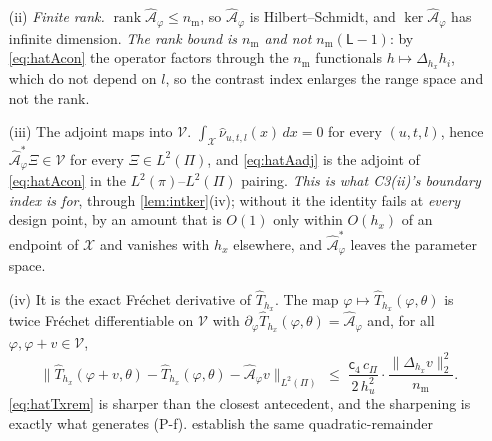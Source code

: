 \begin{proposition}
\begin{enumerate}
{for the other}, which is why \eqref{eq:normconst} carries the \textbf{maximum} of the two conversion
costs and why \cref{def:lfstep} can then assert $\|\omega_n^{-1}\hat{\mathcal A}_\varphi\|\le1$ surely in
both. \emph{This clause is stated here and not inside \cref{def:lfstep} on \cref{rem:obligations}'s
test}: a definition may \emph{fix} a constant, but the inequality that constant has to satisfy is a
claim and belongs to a result. \emph{And it consumes \textbf{less} than \textup{(i)} does}: C1(ii) is
read by neither \eqref{eq:hatAdx} nor \eqref{eq:hatAhatpi}, and only by \eqref{eq:pairgap}, which
compares the two.
\item[(ii)] \emph{Finite rank.} $\operatorname{rank}\hat{\mathcal A}_\varphi\le n_{\mathrm m}$, so
$\hat{\mathcal A}_\varphi$ is Hilbert--Schmidt, and $\ker\hat{\mathcal A}_\varphi$ has infinite
dimension. \emph{The rank bound is $n_{\mathrm m}$ and not $n_{\mathrm m}(\mathsf L-1)$}: by
\eqref{eq:hatAcon} the operator factors through the $n_{\mathrm m}$ functionals
$h\mapsto\Delta_{h_x}h_i$, which do not depend on $l$, so the contrast index enlarges the range space
and not the rank.
\item[(iii)] The adjoint maps into $\mathcal V$. $\int_{\mathcal X}\hat\nu_{u,t,l}(x)\,dx=0$ for
every $(u,t,l)$, hence $\hat{\mathcal A}^\ast_\varphi\Xi\in\mathcal V$ for every $\Xi\in L^{2}(\Pi)$,
and \eqref{eq:hatAadj} is the adjoint of \eqref{eq:hatAcon} in the $L^{2}(\pi)$--$L^{2}(\Pi)$ pairing.
\emph{This is what C3(ii)'s boundary index is for}, through \cref{lem:intker}(iv); without it the
identity fails at \emph{every} design point, by an amount that is $O(1)$ only within $O(h_x)$ of an
endpoint of $\mathcal X$ and vanishes with $h_x$ elsewhere, and
$\hat{\mathcal A}^\ast_\varphi$ leaves the parameter space.
\item[(iv)] It is the exact Fr\'echet derivative of $\hat T_{h_x}$. The map
$\varphi\mapsto\hat T_{h_x}(\varphi,\theta)$ is twice Fr\'echet differentiable on $\mathcal V$ with
$\partial_\varphi\hat T_{h_x}(\varphi,\theta)=\hat{\mathcal A}_\varphi$ and, for all
$\varphi,\varphi+v\in\mathcal V$,
\begin{equation}\label{eq:hatTxrem}
\big\|\hat T_{h_x}(\varphi+v,\theta)-\hat T_{h_x}(\varphi,\theta)-\hat{\mathcal A}_\varphi v\big\|_{L^{2}(\Pi)}
\;\le\;\frac{\mathsf c_4\,c_\Pi}{2\,h_u^{2}}\cdot\frac{\|\Delta_{h_x}v\|_2^{2}}{n_{\mathrm m}} .
\end{equation}
\eqref{eq:hatTxrem} is sharper than the closest antecedent, and the sharpening is exactly what
generates (P-f). \citet[Prop.~4.2(a)]{centorrinofeveflorens2019} establish the same quadratic-remainder

\end{enumerate}
\end{proposition}
